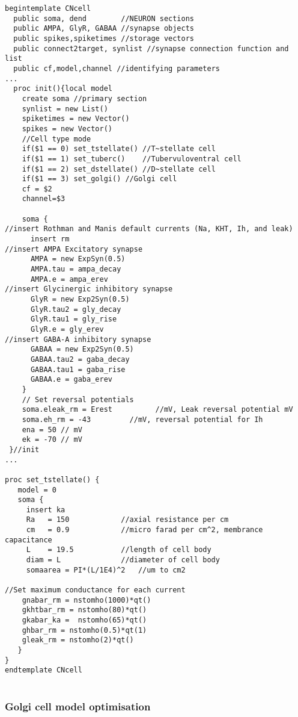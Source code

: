 \begin{lstlisting}[label=lst:CellTemplate,caption=Rothman and Manis cochlear nucleus cell template (in CNcell.tem)]
  begintemplate CNcell
  public soma, dend        //NEURON sections
  public AMPA, GlyR, GABAA //synapse objects
  public spikes,spiketimes //storage vectors
  public connect2target, synlist //synapse connection function and list
  public cf,model,channel //identifying parameters
...
  proc init(){local model
    create soma //primary section
    synlist = new List()
    spiketimes = new Vector()
    spikes = new Vector()
    //Cell type mode
    if($1 == 0) set_tstellate() //T~stellate cell
    if($1 == 1) set_tuberc()    //Tubervuloventral cell
    if($1 == 2) set_dstellate() //D~stellate cell
    if($1 == 3) set_golgi() //Golgi cell
    cf = $2
    channel=$3

    soma {
//insert Rothman and Manis default currents (Na, KHT, Ih, and leak)
      insert rm
//insert AMPA Excitatory synapse
      AMPA = new ExpSyn(0.5)
      AMPA.tau = ampa_decay
      AMPA.e = ampa_erev
//insert Glycinergic inhibitory synapse
      GlyR = new Exp2Syn(0.5)
      GlyR.tau2 = gly_decay
      GlyR.tau1 = gly_rise
      GlyR.e = gly_erev
//insert GABA-A inhibitory synapse
      GABAA = new Exp2Syn(0.5)
      GABAA.tau2 = gaba_decay
      GABAA.tau1 = gaba_rise
      GABAA.e = gaba_erev
    }
    // Set reversal potentials
    soma.eleak_rm = Erest          //mV, Leak reversal potential mV
    soma.eh_rm = -43         //mV, reversal potential for Ih
    ena = 50 // mV
    ek = -70 // mV
 }//init
...

proc set_tstellate() {
   model = 0
   soma {
     insert ka
     Ra   = 150            //axial resistance per cm
     cm   = 0.9            //micro farad per cm^2, membrance capacitance
     L    = 19.5           //length of cell body
     diam = L              //diameter of cell body
     somaarea = PI*(L/1E4)^2   //um to cm2

//Set maximum conductance for each current
	gnabar_rm = nstomho(1000)*qt()
	gkhtbar_rm = nstomho(80)*qt()
	gkabar_ka =  nstomho(65)*qt()
	ghbar_rm = nstomho(0.5)*qt(1)
	gleak_rm = nstomho(2)*qt()
   }
}
endtemplate CNcell


\end{lstlisting}



\subsubsection[Golgi model]{Golgi cell model
  optimisation    \label{sec:APDX:golgi-cell-model}}


